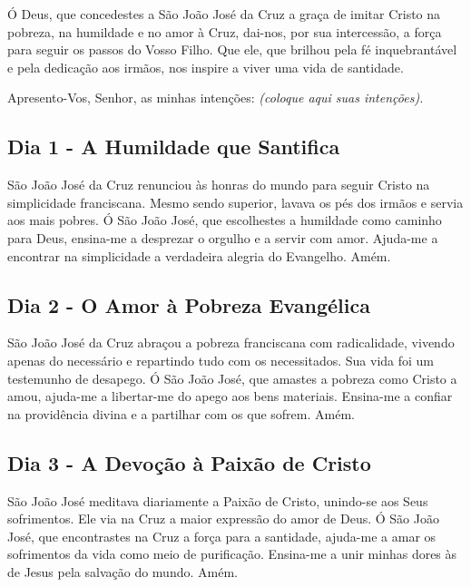 \documentclass[a4paper,14pt]{extarticle} \usepackage[utf8]{inputenc}
\begin{document}
Ó Deus, que concedestes a São João José da Cruz a graça de imitar Cristo na pobreza, na humildade e no amor à Cruz, dai-nos, por sua intercessão, a força para seguir os passos do Vosso Filho. Que ele, que brilhou pela fé inquebrantável e pela dedicação aos irmãos, nos inspire a viver uma vida de santidade.

Apresento-Vos, Senhor, as minhas intenções:
\textit{(coloque aqui suas intenções).}



\subsection{Dia 1 - A Humildade que Santifica}
\underline{}


São João José da Cruz renunciou às honras do mundo para seguir Cristo na simplicidade franciscana. Mesmo sendo superior, lavava os pés dos irmãos e servia aos mais pobres.
Ó São João José, que escolhestes a humildade como caminho para Deus, ensina-me a desprezar o orgulho e a servir com amor. Ajuda-me a encontrar na simplicidade a verdadeira alegria do Evangelho. Amém.

\underline{}


\subsection{Dia 2 - O Amor à Pobreza Evangélica}

\underline{}

São João José da Cruz abraçou a pobreza franciscana com radicalidade, vivendo apenas do necessário e repartindo tudo com os necessitados. Sua vida foi um testemunho de desapego.
Ó São João José, que amastes a pobreza como Cristo a amou, ajuda-me a libertar-me do apego aos bens materiais. Ensina-me a confiar na providência divina e a partilhar com os que sofrem. Amém.

\underline{}


\subsection{Dia 3 - A Devoção à Paixão de Cristo}


\underline{}

São João José meditava diariamente a Paixão de Cristo, unindo-se aos Seus sofrimentos. Ele via na Cruz a maior expressão do amor de Deus.
Ó São João José, que encontrastes na Cruz a força para a santidade, ajuda-me a amar os sofrimentos da vida como meio de purificação. Ensina-me a unir minhas dores às de Jesus pela salvação do mundo. Amém.
\end{document}
